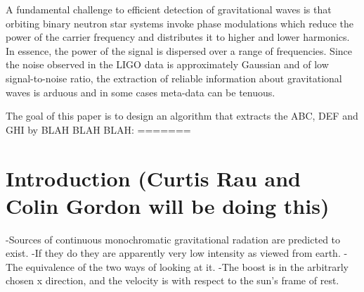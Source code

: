 \documentclass[twocolumn, groupedaddress]{revtex4-1}
\begin{document}
A fundamental challenge to efficient detection of gravitational waves is that orbiting binary neutron star systems invoke phase modulations which reduce the power of the carrier frequency and distributes it to higher and lower harmonics. In essence, the power of the signal is dispersed over a range of frequencies. Since the noise observed in the LIGO data is approximately Gaussian and of low signal-to-noise ratio, the extraction of reliable information about gravitational waves is arduous and in some cases meta-data can be tenuous.  

The goal of this paper is to design an algorithm that extracts the ABC, DEF and GHI by BLAH BLAH BLAH:
=======
\section{Introduction (Curtis Rau and Colin Gordon will be doing this)}

-Sources of continuous monochromatic gravitational radation are predicted to exist.
-If they do they are apparently very low intensity as viewed from earth.
-The equivalence of the two ways of looking at it.
-The boost is in the arbitrarly chosen x direction, and the velocity is with respect to the sun's frame of rest.
\end{document}
